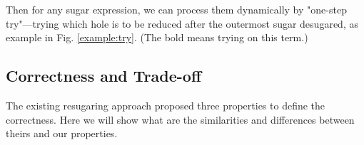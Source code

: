 Then for any sugar expression, we can process them dynamically by "one-step try"---trying which hole is to be reduced after the outermost sugar desugared, as example in Fig.  \ref{example:try}. (The bold  means trying on this term.)



\subsection{Correctness and Trade-off}
The existing resugaring approach proposed three properties to define the correctness. Here we will show what are the similarities and differences between theirs and our properties.

